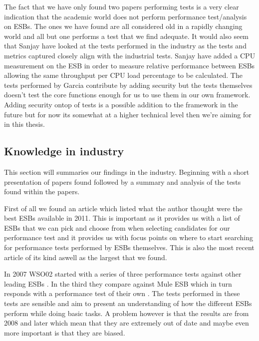 The fact that we have only found two papers performing tests is a very clear indication that the academic world does not perform performance test/analysis on ESBs. The ones we have found are all considered old in a rapidly changing world and all but one performs a test that we find adequate. 
It would also seem that Sanjay \cite{Sanjay2011} have looked at the tests performed in the industry as the tests and metrics captured closely align with the industrial tests. 
Sanjay \cite{Sanjay2011} have added a CPU measurement on the ESB in order to measure relative performance between ESBs allowing the same throughput per CPU load percentage to be calculated.
The tests performed by Garcia \cite{Garcia2010} contribute by adding security but the tests themselves doesn't test the core functions enough for us to use them in our own framework. 
Adding security ontop of tests is a possible addition to the framework in the future but for now its somewhat at a higher technical level then we're aiming for in this thesis.


\subsection{Knowledge in industry}
\label{sec:industry_section}
This section will summaries our findings in the industry. Beginning with a short presentation of papers found followed by a summary and analysis of the tests found within the papers.


First of all we found an article \cite{mehta11} which listed what the author thought were the best ESBs available in 2011. This is important as it provides us with a list of ESBs that we can pick and choose from when selecting candidates for our performance test and it provides us with focus points on where to start searching for performance tests performed by ESBs themselves. This is also the most recent article of its kind aswell as the largest that we found.


In 2007 WSO02 started with a series of three performance tests against other leading ESBs \cite{Perera07,Perera07R2,Perera07R3}. In the third they compare against Mule ESB which in turn responds with a performance test of their own \cite{mulesoft08}. The tests performed in these tests are sensible and aim to present an understanding of how the different ESBs perform while doing basic tasks. A problem however is that the results are from 2008 and later which mean that they are extremely out of date and maybe even more important is that they are biased.


